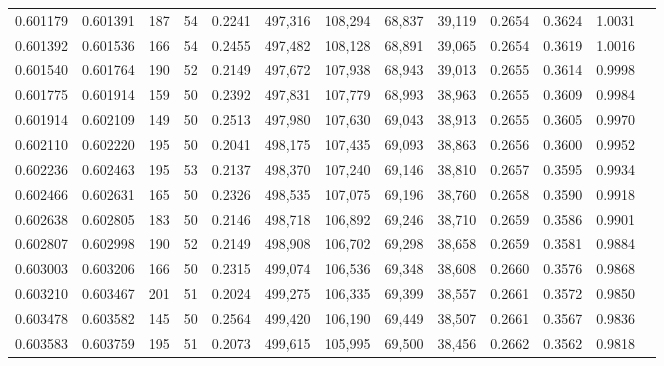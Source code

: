 \begin{tabular}{rrrrrrrrrrrrr}
0.601179 & 0.601391 &   187 &  54 &                                     0.2241 & 497,316 & 108,294 &  68,837 &  39,119 & 0.2654 & 0.3624 & 1.0031 \\
0.601392 & 0.601536 &   166 &  54 &                                     0.2455 & 497,482 & 108,128 &  68,891 &  39,065 & 0.2654 & 0.3619 & 1.0016 \\
0.601540 & 0.601764 &   190 &  52 &                                     0.2149 & 497,672 & 107,938 &  68,943 &  39,013 & 0.2655 & 0.3614 & 0.9998 \\
0.601775 & 0.601914 &   159 &  50 &                                     0.2392 & 497,831 & 107,779 &  68,993 &  38,963 & 0.2655 & 0.3609 & 0.9984 \\
0.601914 & 0.602109 &   149 &  50 &                                     0.2513 & 497,980 & 107,630 &  69,043 &  38,913 & 0.2655 & 0.3605 & 0.9970 \\
0.602110 & 0.602220 &   195 &  50 &                                     0.2041 & 498,175 & 107,435 &  69,093 &  38,863 & 0.2656 & 0.3600 & 0.9952 \\
0.602236 & 0.602463 &   195 &  53 &                                     0.2137 & 498,370 & 107,240 &  69,146 &  38,810 & 0.2657 & 0.3595 & 0.9934 \\
0.602466 & 0.602631 &   165 &  50 &                                     0.2326 & 498,535 & 107,075 &  69,196 &  38,760 & 0.2658 & 0.3590 & 0.9918 \\
0.602638 & 0.602805 &   183 &  50 &                                     0.2146 & 498,718 & 106,892 &  69,246 &  38,710 & 0.2659 & 0.3586 & 0.9901 \\
0.602807 & 0.602998 &   190 &  52 &                                     0.2149 & 498,908 & 106,702 &  69,298 &  38,658 & 0.2659 & 0.3581 & 0.9884 \\
0.603003 & 0.603206 &   166 &  50 &                                     0.2315 & 499,074 & 106,536 &  69,348 &  38,608 & 0.2660 & 0.3576 & 0.9868 \\
0.603210 & 0.603467 &   201 &  51 &                                     0.2024 & 499,275 & 106,335 &  69,399 &  38,557 & 0.2661 & 0.3572 & 0.9850 \\
0.603478 & 0.603582 &   145 &  50 &                                     0.2564 & 499,420 & 106,190 &  69,449 &  38,507 & 0.2661 & 0.3567 & 0.9836 \\
0.603583 & 0.603759 &   195 &  51 &                                     0.2073 & 499,615 & 105,995 &  69,500 &  38,456 & 0.2662 & 0.3562 & 0.9818 \\

\end{tabular}
